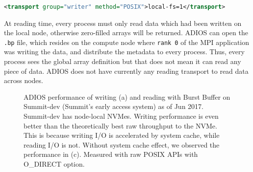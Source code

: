 \begin{lstlisting}[language=XML]
<transport group="writer" method="POSIX">local-fs=1</transport>
\end{lstlisting}

At reading time, every process must only read data which had been written on the local node, otherwise zero-filled arrays will be returned. ADIOS can open the \verb+.bp+ file, which resides on the compute node where \verb+rank 0+ of the MPI application was writing the data, and distribute the metadata to every process. Thus, every process sees the global array definition but that does not mean it can read any piece of data. ADIOS does not have currently any reading transport to read data across nodes. 

\begin{figure}[h]
\center
{}
\caption{ADIOS performance of writing (a) and reading with Burst Buffer on Summit-dev (Summit's early access system) as of Jun 2017. Summit-dev has node-local NVMes. Writing performance is even better than the theoretically best raw throughput to the NVMe. This is because writing I/O is accelerated by system cache, while reading I/O is not. Without system cache effect, we observed the performance in (c). Measured with raw POSIX APIs with O\_DIRECT option.}
\label{fig:summit}
\end{figure}

